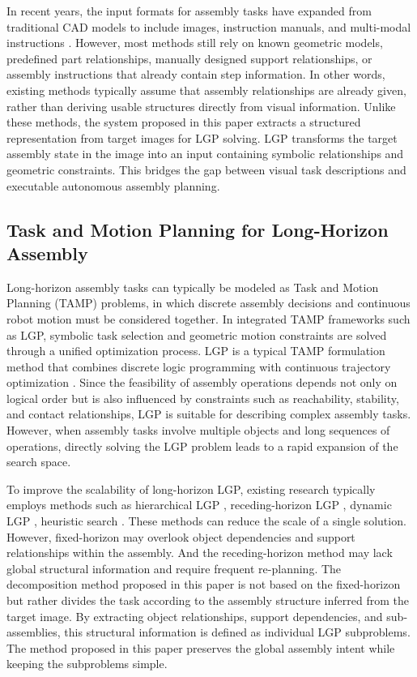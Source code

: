 \documentclass[letterpaper, 10 pt, conference]{ieeeconf}  %
\begin{document}
In recent years, the input formats for assembly tasks have expanded from traditional CAD models to include images, instruction manuals, and multi-modal instructions \cite{11224520}.
However, most methods still rely on known geometric models, predefined part relationships, manually designed support relationships, or assembly instructions that already contain step information.
In other words, existing methods typically assume that assembly relationships are already given, rather than deriving usable structures directly from visual information.
Unlike these methods, the system proposed in this paper extracts a structured representation from target images for LGP solving.
LGP transforms the target assembly state in the image into an input containing symbolic relationships and geometric constraints.
This bridges the gap between visual task descriptions and executable autonomous assembly planning.

\subsection{Task and Motion Planning for Long-Horizon Assembly}
Long-horizon assembly tasks can typically be modeled as Task and Motion Planning (TAMP) problems, in which discrete assembly decisions and continuous robot motion must be considered together.
In integrated TAMP frameworks such as LGP, symbolic task selection and geometric motion constraints are solved through a unified optimization process.
LGP is a typical TAMP formulation method that combines discrete logic programming with continuous trajectory optimization \cite{2832415.2832517}.
Since the feasibility of assembly operations depends not only on logical order but is also influenced by constraints such as reachability, stability, and contact relationships, LGP is suitable for describing complex assembly tasks.
However, when assembly tasks involve multiple objects and long sequences of operations, directly solving the LGP problem leads to a rapid expansion of the search space.

To improve the scalability of long-horizon LGP, existing research typically employs methods such as hierarchical LGP \cite{9515539}, receding-horizon LGP \cite{9981797}, dynamic LGP \cite{10610285}, heuristic search \cite{10611389}.
These methods can reduce the scale of a single solution.
However, fixed-horizon may overlook object dependencies and support relationships within the assembly.
And the receding-horizon method may lack global structural information and require frequent re-planning.
The decomposition method proposed in this paper is not based on the fixed-horizon but rather divides the task according to the assembly structure inferred from the target image.
By extracting object relationships, support dependencies, and sub-assemblies, this structural information is defined as individual LGP subproblems.
The method proposed in this paper preserves the global assembly intent while keeping the subproblems simple.
\end{document}

